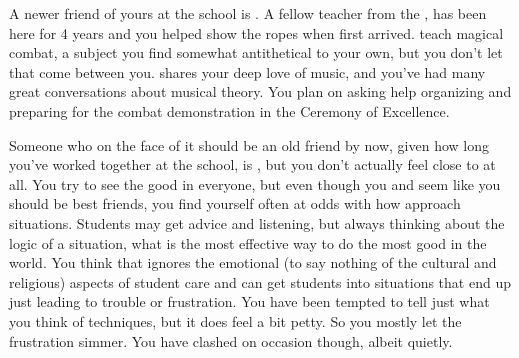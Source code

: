 \documentclass[char]{GL2020}
\begin{document}
A newer friend of yours at the school is \cInterpol{\full}. A fellow teacher from the \pFarm{}, \cInterpol{} has been here for 4 years and you helped show \cInterpol{\them} the ropes when \cInterpol{\they} first arrived. \cInterpol{\They} teach\cInterpol{\verbes} magical combat, a subject you find somewhat antithetical to your own, but you don't let that come between you. \cInterpol{} shares your deep love of music, and you've had many great conversations about musical theory. You plan on asking \cInterpol{\their} help organizing and preparing for the combat demonstration in the Ceremony of Excellence.

Someone who on the face of it should be an old friend by now, given how long you’ve worked together at the school, is \cEthics{}, but you don’t actually feel close to \cEthics{\them} at all. You try to see the good in everyone, but even though you and \cEthics{} seem like you should be best friends, you find yourself often at odds with how \cEthics{\they} approach\cEthics{\verbes} situations. Students may get advice and listening, but \cEthics{\theyare} always thinking about the logic of a situation, what is the most effective way to do the most good in the world. You think that \cEthics{} ignores the emotional (to say nothing of the cultural and religious) aspects of student care and can get students into situations that end up just leading to trouble or frustration. You have been tempted to tell \cEthics{\them} just what you think of \cEthics{\their} techniques, but it does feel a bit petty. So you mostly let the frustration simmer. You have clashed on occasion though, albeit quietly.
\end{document}
